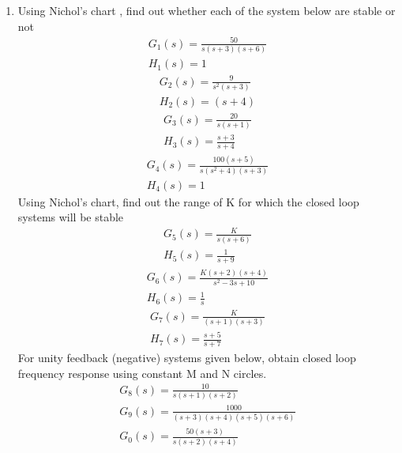 \begin{enumerate}[label=\thesection.\arabic*.,ref=\thesection.\theenumi]
\item Using Nichol's chart , find out whether each of the system below are stable or not 
\begin{align}
G_1(s)= \frac{50}{s(s+3)(s+6)}
\label{eq:es17btech11009_a}
\\
 H_1(s)= 1
 \label{eq:es17btech11009_b}
\end{align}
\begin{align}
G_2(s)= \frac{9}{s^2(s+3)}
\label{eq:es17btech11009_c}
\\
 H_2(s)= (s+4)
 \label{eq:es17btech11009_d}
\end{align}
\begin{align}
G_3(s)= \frac{20}{s(s+1)}
\label{eq:es17btech11009_e}
\\
 H_3(s)= \frac{s+3}{s+4}
 \label{eq:es17btech11009_f}
\end{align}
\begin{align}
G_4(s)= \frac{100(s+5)}{s(s^2+4)(s+3)}
\label{eq:es17btech11009_g}
\\
 H_4(s)= 1
 \label{eq:es17btech11009_h}
\end{align}
Using Nichol's chart, find out the range of K for which the closed loop systems will be stable
\begin{align}
G_5(s)= \frac{K}{s(s+6)}
\label{eq:es17btech11009_i}
\\
 H_5(s)= \frac{1}{s+9}
 \label{eq:es17btech11009_j}
\end{align}
\begin{align}
G_6(s)= \frac{K(s+2)(s+4)}{s^2 - 3s +10}
\label{eq:es17btech11009_k}
\\
 H_6(s)= \frac{1}{s}
 \label{eq:es17btech11009_l}
\end{align}
\begin{align}
G_7(s)= \frac{K}{(s+1)(s+3)}
\label{eq:es17btech11009_m}
\\
 H_7(s)= \frac{s+5}{s+7}
 \label{eq:es17btech11009_n}
\end{align}
For unity feedback (negative) systems given below, obtain closed loop frequency response using constant M and N circles.
\begin{align}
G_8(s)= \frac{10}{s(s+1)(s+2)}
 \label{eq:es17btech11009_o}
 \\
G_9(s)= \frac{1000}{(s+3)(s+4)(s+5)(s+6)}
\label{eq:es17btech11009_p}
\\
G_0(s)= \frac{50(s+3)}{s(s+2)(s+4)}
\label{eq:es17btech11009_q}

\end{align}
\end{enumerate}

